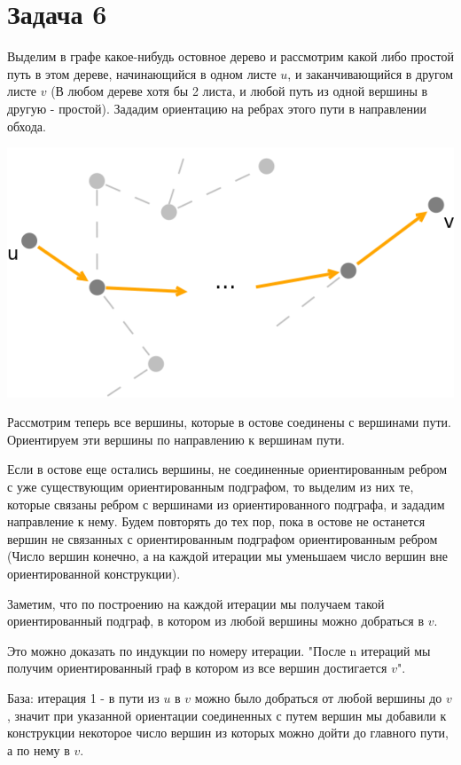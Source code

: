 \documentclass{article}
\begin{document}
	\section{Задача 6}
	Выделим в графе какое-нибудь остовное дерево и рассмотрим какой либо простой путь в этом дереве, начинающийся в одном листе $u$, и заканчивающийся в другом листе $v$ (В любом дереве хотя бы 2 листа, и любой путь из одной вершины в другую - простой). Зададим ориентацию на ребрах этого пути в направлении обхода.
	
	\includegraphics[scale=0.6]{6_1}
	
	Рассмотрим теперь все вершины, которые в остове соединены с вершинами пути. Ориентируем эти вершины по направлению к вершинам пути. 
	
	Если в остове еще остались вершины, не соединенные ориентированным ребром с уже существующим ориентированным подграфом, то выделим из них те, которые связаны ребром с вершинами из ориентированного подграфа, и зададим направление к нему. Будем повторять до тех пор, пока в остове не останется вершин не связанных с ориентированным подграфом ориентированным ребром (Число вершин конечно, а на каждой итерации мы уменьшаем число вершин вне ориентированной конструкции). 
	
	Заметим, что по построению на каждой итерации мы получаем такой ориентированный подграф, в котором из любой вершины можно добраться в  $v$.
	
	Это можно доказать по индукции по номеру итерации. "После n итераций мы получим ориентированный граф в котором из все вершин достигается $v$". 
	
	База: итерация 1 - в пути из $u$ в $v$ можно было добраться от любой вершины до $v$, значит при указанной ориентации соединенных с путем вершин мы добавили к конструкции некоторое число вершин из которых можно дойти до главного пути, а по нему в $v$. 
	
\end{document}
